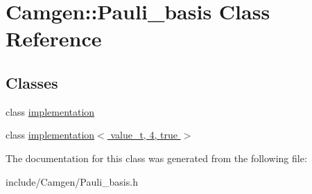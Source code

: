\hypertarget{a00415}{}\section{Camgen\+:\+:Pauli\+\_\+basis Class Reference}
\label{a00415}
\subsection*{Classes}
\begin{DoxyCompactItemize}
\item 
class \hyperlink{a00297}{implementation}
\item 
class \hyperlink{a00307}{implementation$<$ value\+\_\+t, 4, true $>$}
\end{DoxyCompactItemize}


The documentation for this class was generated from the following file\+:\begin{DoxyCompactItemize}
\item 
include/\+Camgen/Pauli\+\_\+basis.\+h\end{DoxyCompactItemize}
